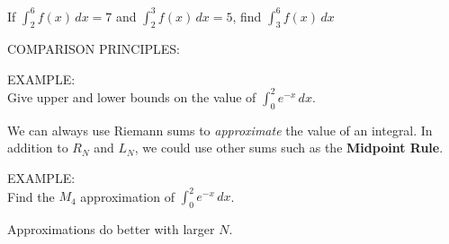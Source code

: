 \documentclass[11pt]{article}
\begin{document}
If   $\int_{2}^{6}f(x)\, dx = 7$ and $\int_{2}^{3}f(x)\, dx = 5$, find $\int_{3}^{6}f(x)\, dx$  

\vspace{1.5in}


COMPARISON PRINCIPLES:

\vspace{4in}


EXAMPLE: \\

Give upper and lower bounds on the value of $\int_0^2e^{-x}\, dx$.


\pagebreak

We can always use Riemann sums to \emph{approximate} the value of an integral.  In addition to $R_N$ and $L_N$,
we could use other sums such as the {\bf Midpoint Rule}.  


\vspace{3in}

EXAMPLE: \\

Find the $M_4$ approximation of  $\int_0^2e^{-x}\, dx$.

\vspace{2.5in}

Approximations do better with larger $N$.
\end{document}

